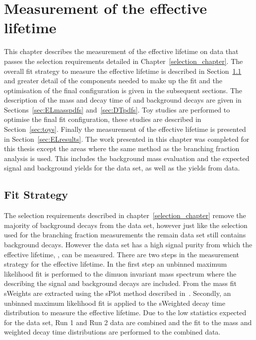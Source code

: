 \chapter{Measurement of the \bsmumu effective lifetime}
\label{sec:lifetimemeasurement}

This chapter describes the measurement of the \bsmumu effective lifetime on data that passes the selection requirements detailed in Chapter~\ref{selection_chapter}. The overall fit strategy to measure the effective lifetime is described in Section~\ref{sec:fitstrategy} and greater detail of the components needed to make up the fit and the optimisation of the final configuration is given in the subsequent sections. The description of the mass and decay time \pdfs of \bmumu  and background decays are given in Sections~\ref{sec:ELmasspdfs} and~\ref{sec:DTpdfs}. Toy studies are performed to optimise the final fit configuration, these studies are described in Section~\ref{sec:toys}. Finally the measurement of the \bsmumu effective lifetime is presented in Section~\ref{sec:ELresults}.
The work presented in this chapter was completed for this thesis except the areas where the same method as the branching fraction analysis is used. This includes the background mass \pdf evaluation and the expected signal and background yields for the data set, as well as the \bsjpisphi yields from data. 


\section{Fit Strategy}
\label{sec:fitstrategy}

The selection requirements described in chapter~\ref{selection_chapter} remove the majority of background decays from the data set, however just like the selection used for the branching fraction measurements the remain data set still contains background decays. However the data set has a high signal purity from which the \bsmumu effective lifetime, \tmumu, can be measured. There are two steps in the measurement strategy for the effective lifetime. In the first step an unbinned maximum likelihood fit is performed to the dimuon invariant mass spectrum where the \pdfs describing the \bsmumu signal and background decays are included. From the mass fit sWeights are extracted using the sPlot method described in~\cite{Pivk:2004ty}. Secondly, an unbinned maximum likelihood fit is applied to the sWeighted decay time distribution to measure the \bsmumu effective lifetime. Due to the low statistics expected for the data set, Run 1 and Run 2 data are combined and the \ml fit to the mass and weighted decay time distributions are performed to the combined data.

